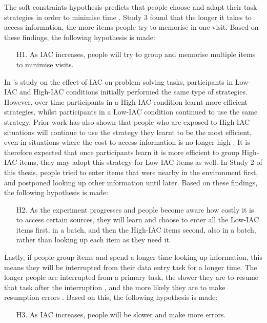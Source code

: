 The soft constraints hypothesis predicts that people choose and adapt their task strategies in order to minimise time \citep{Gray2006}. Study 3 found that the longer it takes to access information, the more items people try to memorise in one visit. Based on these findings, the following hypothesis is made: 
\begin{itemize}
\item[H1.]
As IAC increases, people will try to group and memorise multiple items to minimise visits.
\end{itemize}

In \citet{OHara1998}'s study on the effect of IAC on problem solving tasks, participants in Low-IAC and High-IAC conditions initially performed the same type of strategies. However, over time participants in a High-IAC condition  learnt more efficient strategies, whilst participants in a Low-IAC condition continued to use the same strategy. Prior work has also shown that people who are exposed to High-IAC situations will continue to use the strategy they learnt to be the most efficient, even in situations where the cost to access information is no longer high \citep{Patrick2014}. It is therefore expected that once participants learn it is more efficient to group High-IAC items, they may adopt this strategy for Low-IAC items as well. In Study 2 of this thesis, people tried to enter items that were nearby in the environment first, and postponed looking up other information until later. Based on these findings, the following hypothesis is made: 
\begin{itemize}
\item [H2.]
As the experiment progresses and people become aware how costly it is to access certain sources, they will learn and choose to enter all the Low-IAC items first, in a batch, and then the High-IAC items second, also in a batch, rather than looking up each item as they need it. 
\end{itemize}

Lastly, if people group items and spend a longer time looking up information, this means they will be interrupted from their data entry task for a longer time. The longer people are interrupted from a primary task, the slower they are to resume that task after the interruption \citep{Monk2008}, and the more likely they are to make resumption errors  \citep[e.g.][]{Brumby2013}. Based on this, the following hypothesis is made:
\begin{itemize}
\item[H3.]
As IAC increases, people will be slower and make more errors.
\end{itemize}

